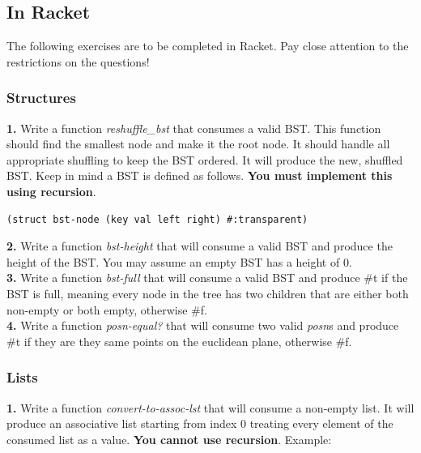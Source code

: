 \documentclass[12pt,extarticle]{article}
\begin{document}
\subsection{In Racket}

The following exercises are to be completed in Racket. Pay close attention to the restrictions on the questions!

\subsubsection{Structures}

\textbf{1.} Write a function \emph{reshuffle\_bst} that consumes a valid BST. This function should find the smallest node and make it the root node. It should handle all appropriate shuffling to keep the BST ordered. It will produce the new, shuffled BST. Keep in mind a BST is defined as follows. \textbf{You must implement this using recursion}.\\

\lstset {
	language=Lisp
}
\begin{lstlisting}
(struct bst-node (key val left right) #:transparent)
\end{lstlisting}

\noindent
\textbf{2.} Write a function \emph{bst-height} that will consume a valid BST and produce the height of the BST. You may assume an empty BST has a height of 0.\\

\noindent
\textbf{3.} Write a function \emph{bst-full} that will consume a valid BST and produce \#t if the BST is full, meaning every node in the tree has two children that are either both non-empty or both empty, otherwise \#f.\\

\noindent
\textbf{4.} Write a function \emph{posn-equal?} that will consume two valid \emph{posn}s and produce \#t if they are they same points on the euclidean plane, otherwise \#f.\\

\subsubsection{Lists}

\textbf{1.} Write a function \emph{convert-to-assoc-lst} that will consume a non-empty list. It will produce an associative list starting from index 0 treating every element of the consumed list as a value. \textbf{You cannot use recursion}. Example:\\
\end{document}
